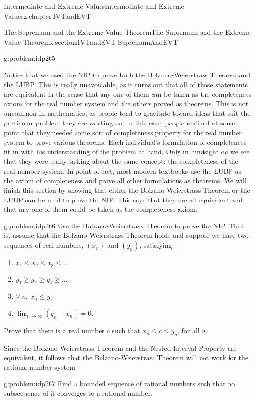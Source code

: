 \begin{chapterptx}{Intermediate and Extreme Values}{}{Intermediate and Extreme Values}{}{}{x:chapter:IVTandEVT}
\begin{sectionptx}{The Supremum and the Extreme Value Theorem}{}{The Supremum and the Extreme Value Theorem}{}{}{x:section:IVTandEVT-SupremumAndEVT}
\begin{problem}{}{g:problem:idp265}
		\end{problem}
		Notice that we used the NIP to prove both the Bolzano-Weierstrass Theorem and the LUBP. This is really unavoidable, as it turns out that all of those statements are equivalent in the sense that any one of them can be taken as the completeness axiom for the real number system and the others proved as theorems. This is not uncommon in mathematics, as people tend to gravitate toward ideas that suit the particular problem they are working on. In this case, people realized at some point that they needed some sort of completeness property for the real number system to prove various theorems. Each individual's formulation of completeness fit in with his understanding of the problem at hand. Only in hindsight do we see that they were really talking about the same concept: the completeness of the real number system. In point of fact, most modern textbooks use the LUBP as the axiom of completeness and prove all other formulations as theorems. We will finish this section by showing that either the Bolzano-Weierstrass Theorem or the LUBP can be used to prove the NIP. This says that they are all equivalent and that any one of them could be taken as the completeness axiom.%
		\begin{problem}{}{g:problem:idp266}%
			 Use the Bolzano-Weierstrass Theorem to prove the NIP. That is, assume that the Bolzano-Weierstrass Theorem holds and suppose we have two sequences of real numbers, \(\left(x_n\right)\) and \(\left(y_n\right)\), satisfying:%
			\begin{enumerate}
				\item{}\(\displaystyle x_1\le x_2 \le x_3 \le \ldots\)%
				\item{}\(\displaystyle y_1\ge y_2 \ge y_3 \ge \ldots\)%
				\item{}\(\displaystyle \forall\ n,\ x_n\le y_n\)%
				\item{}\(\displaystyle\lim_{n\rightarrow\infty}\left(y_n-x_n\right) = 0\).%
			\end{enumerate}
			\par
			Prove that there is a real number \(c\) such that \(x_n\le c\le y_n\), for all \(n\).%
		\end{problem}
		Since the Bolzano-Weierstrass Theorem and the Nested Interval Property are equivalent, it follows that the Bolzano-Weierstrass Theorem will not work for the rational number system.%
		\begin{problem}{}{g:problem:idp267}%
			 Find a bounded sequence of rational numbers such that no subsequence of it converges to a rational number.%

\end{problem}
\end{sectionptx}
\end{chapterptx}
